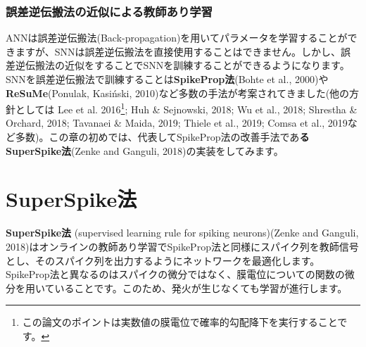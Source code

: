\subsubsection{誤差逆伝搬法の近似による教師あり学習}

ANNは誤差逆伝搬法(Back-propagation)を用いてパラメータを学習することができますが、SNNは誤差逆伝搬法を直接使用することはできません。しかし、誤差逆伝搬法の近似をすることでSNNを訓練することができるようになります。SNNを誤差逆伝搬法で訓練することは\textbf{SpikeProp法}(Bohte et al., 2000)や\textbf{ReSuMe}(Ponulak, Kasiński, 2010)など多数の手法が考案されてきました(他の方針としては Lee et al. 2016\footnote{この論文のポイントは実数値の膜電位で確率的勾配降下を実行することです。}; Huh \& Sejnowski, 2018; Wu et al., 2018; Shrestha \& Orchard, 2018; Tavanaei \& Maida, 2019; Thiele et al., 2019; Comsa et al., 2019など多数)。この章の初めでは、代表してSpikeProp法の改善手法であ\textbf{るSuperSpike法}(Zenke and Ganguli, 2018)の実装をしてみます。
\section{SuperSpike法}
\textbf{SuperSpike法} (supervised learning rule for spiking neurons)(Zenke and Ganguli, 2018)はオンラインの教師あり学習でSpikeProp法と同様にスパイク列を教師信号とし、そのスパイク列を出力するようにネットワークを最適化します。SpikeProp法と異なるのはスパイクの微分ではなく、膜電位についての関数の微分を用いていることです。このため、発火が生じなくても学習が進行します。
